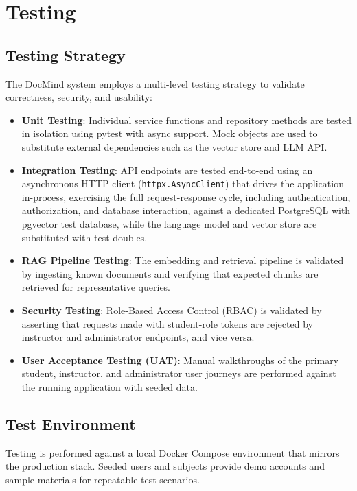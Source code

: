 \documentclass[12pt, a4paper, oneside]{report}
\let\oldsection\section
\renewcommand{\section}{%
  \addtocontents{toc}{\protect\needspace{4\baselineskip}}%
  \oldsection
}
\let\oldsubsection\subsection
\renewcommand{\subsection}{%
  \addtocontents{toc}{\protect\needspace{3\baselineskip}}%
  \oldsubsection
}
\begin{document}
\section{Testing}

\subsection{Testing Strategy}

The DocMind system employs a multi-level testing strategy to validate correctness, security, and usability:

\begin{itemize}
  \item \textbf{Unit Testing}: Individual service functions and repository methods are tested in isolation using pytest with async support. Mock objects are used to substitute external dependencies such as the vector store and LLM API.
  \item \textbf{Integration Testing}: API endpoints are tested end-to-end using an asynchronous HTTP client (\texttt{httpx.AsyncClient}) that drives the application in-process, exercising the full request-response cycle, including authentication, authorization, and database interaction, against a dedicated PostgreSQL with pgvector test database, while the language model and vector store are substituted with test doubles.
  \item \textbf{RAG Pipeline Testing}: The embedding and retrieval pipeline is validated by ingesting known documents and verifying that expected chunks are retrieved for representative queries.
  \item \textbf{Security Testing}: Role-Based Access Control (RBAC) is validated by asserting that requests made with student-role tokens are rejected by instructor and administrator endpoints, and vice versa.
  \item \textbf{User Acceptance Testing (UAT)}: Manual walkthroughs of the primary student, instructor, and administrator user journeys are performed against the running application with seeded data.
\end{itemize}

\subsection{Test Environment}

Testing is performed against a local Docker Compose environment that mirrors the production stack. Seeded users and subjects provide demo accounts and sample materials for repeatable test scenarios.
\end{document}
